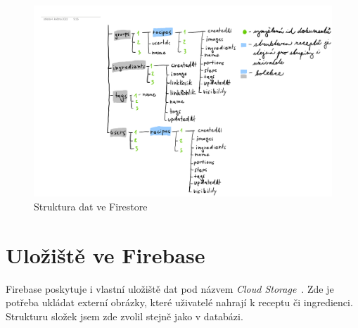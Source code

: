 \begin{figure}[H]
    \includegraphics[width=\textwidth]{pdf/navrh-firestore}
    \caption{Struktura dat ve Firestore} \label{picture:recipeo:firestore-structure}
\end{figure}


\section{Uložiště ve Firebase}
Firebase poskytuje i vlastní uložiště dat pod názvem \emph{Cloud Storage}~\cite{CloudStorage}. Zde je potřeba ukládat externí obrázky, které uživatelé
nahrají k receptu či ingredienci. Strukturu složek jsem zde zvolil stejně jako v databázi.

